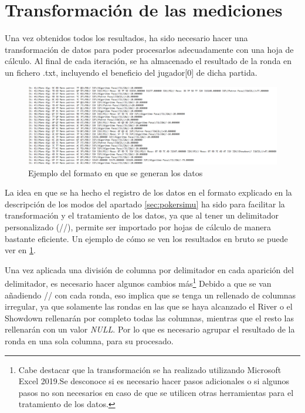 \section{Transformación de las mediciones}

Una vez obtenidos todos los resultados, ha sido necesario hacer una transformación de datos para poder procesarlos adecuadamente con una hoja de cálculo. Al final de cada iteración, se ha almacenado el resultado de la ronda en un fichero .txt, incluyendo el beneficio del jugador[0] de dicha partida.
\begin{figure}[h]
\centering
\includegraphics[width=1\textwidth]{figuras/resultados.png}   
\caption{Ejemplo del formato en que se generan los datos}
\label{fig:resultados}
\end{figure}

La idea en que se ha hecho el registro de los datos en el formato explicado en la descripción de los modos del apartado \ref{sec:pokersimu} ha sido para facilitar la transformación y el tratamiento de los datos, ya que al tener un delimitador personalizado (//), permite ser importado por hojas de cálculo de manera bastante eficiente. Un ejemplo de cómo se ven los resultados en bruto se puede ver en \ref{fig:resultados}.

Una vez aplicada una división de columna por delimitador en cada aparición del delimitador, es necesario hacer algunos cambios más\footnote{Cabe destacar que la transformación se ha realizado utilizando Microsoft Excel 2019.Se desconoce si es necesario hacer pasos adicionales o si algunos pasos no son necesarios en caso de que se utilicen otras herramientas para el tratamiento de los datos.}
Debido a que se van añadiendo // con cada ronda, eso implica que se tenga un rellenado de columnas irregular, ya que solamente las rondas en las que se haya alcanzado el River o el Showdown rellenarán por completo todas las columnas, mientras que el resto las rellenarán con un valor \textit{NULL}.  Por lo que es necesario agrupar el resultado de la ronda en una sola columna, para su procesado.

